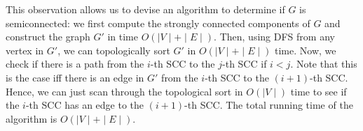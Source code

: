 This observation allows us to devise an algorithm to determine if $G$ is semiconnected: we first compute the strongly connected components of $G$ and construct the graph $G'$ in time $O(\mid V \mid + \mid E \mid)$. Then, using DFS from any vertex in $G'$, we can topologically sort $G'$ in $O(\mid V \mid  + \mid E \mid)$ time. Now, we check if there is a path from the $i$-th SCC to the $j$-th SCC if $i < j$. Note that this is the case iff there is an edge in $G'$ from the $i$-th SCC to the $(i + 1)$-th SCC. Hence, we can just scan through the topological sort in $O(\mid V \mid)$ time to see if the $i$-th SCC has an edge to the $(i + 1)$-th SCC. The total running time of the algorithm is $O(\mid V \mid + \mid E \mid)$.